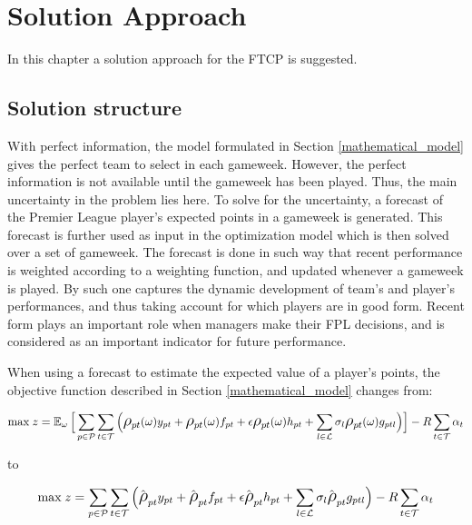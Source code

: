 

\chapter{Solution Approach} \label{chapter_solution_approach}

In this chapter a solution approach for the FTCP is suggested. 

\section{Solution structure}
With perfect information, the model formulated in Section \ref{mathematical_model} gives the perfect team to select in each gameweek. However, the perfect information is not available until the gameweek has been played. Thus, the main uncertainty in the problem lies here. To solve for the uncertainty, a forecast of the Premier League player's expected points in a gameweek is generated. This forecast is further used as input in the optimization model which is then solved over a set of gameweek. The forecast is done in such way that recent performance is weighted according to a weighting function, and updated whenever a gameweek is played. By such one captures the dynamic development of team's and player's performances, and thus taking account for which players are in good form. Recent form plays an important role when managers make their FPL decisions, and is considered as an important indicator for future performance.   

\newpar
\newpage
When using a forecast to estimate the expected value of a player's points, the objective function described in Section \ref{mathematical_model} changes from: 

\begin{equation*}
\text{max} \; z = \EX_{\omega} \Big\lbrack\sum_{p \in \mathcal{P}} \sum_{t \in \mathcal{T}} \Big( \mathlarger{\rho}_{pt}(\omega)y_{pt} +  \mathlarger{\rho}_{pt}(\omega)f_{pt} + \epsilon \mathlarger{\rho}_{pt}(\omega)h_{pt} + \sum_{l \in \mathcal{L}}\sigma_{l} \mathlarger{\rho}_{pt}(\omega)g_{ptl} \Big) \Big\rbrack - R\sum_{t \in \mathcal{T}}\alpha_{t}
\end{equation*}

to 

\begin{equation*}
\text{max} \; z = \sum_{p \in \mathcal{P}} \sum_{t \in \mathcal{T}} \Big( \hat{\mathlarger{\rho}}_{pt} y_{pt} + \hat{\mathlarger{\rho}}_{pt}f_{pt} + \epsilon \hat{\mathlarger{\rho}}_{pt}h_{pt} + \sum_{l \in \mathcal{L}}\sigma_{l} \hat{\mathlarger{\rho}}_{pt} g_{ptl} \Big) - R\sum_{t \in \mathcal{T}}\alpha_{t}
\end{equation*}


